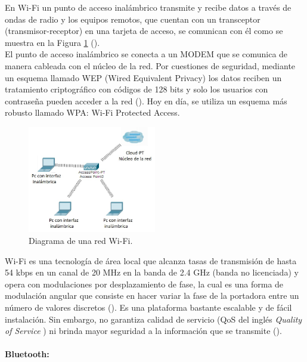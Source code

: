 En Wi-Fi un punto de acceso inalámbrico transmite y recibe datos a través de ondas de radio y los equipos remotos, que cuentan con un transceptor (transmisor-receptor) en una tarjeta de acceso, se comunican con él como se muestra en la Figura \ref{Mcinco} (\cite{MT-07}).\\  

El punto de acceso inalámbrico se conecta a un MODEM que se comunica de manera cableada con el núcleo de la red. Por cuestiones de seguridad, mediante un esquema llamado WEP (Wired Equivalent Privacy) los datos reciben un tratamiento criptográfico con códigos de 128 bits y solo los usuarios con contraseña pueden acceder a la red (\cite{MT-08}). Hoy en día, se utiliza un esquema más robusto llamado WPA: Wi-Fi Protected Access.

%
\begin{figure}[H]
\centering
\includegraphics[width=0.5\textwidth]{marco/fig5.jpg}
\caption{Diagrama de una red Wi-Fi. }
\label{Mcinco}
\end{figure}
%

Wi-Fi es una tecnología de área local que alcanza tasas de transmisión de hasta 54 kbps en un canal de 20 MHz en la banda de 2.4 GHz (banda no licenciada) y opera con modulaciones por desplazamiento de fase, la cual es una forma de modulación angular que consiste en hacer variar la fase de la portadora entre un número de valores discretos (\cite{MT-09}). Es una plataforma bastante escalable y de fácil instalación. Sin embargo, no garantiza calidad de servicio (QoS del inglés \textit{Quality of Service} ) ni brinda mayor seguridad a la información que se transmite (\cite{MT-10}).



\paragraph{Bluetooth:}

